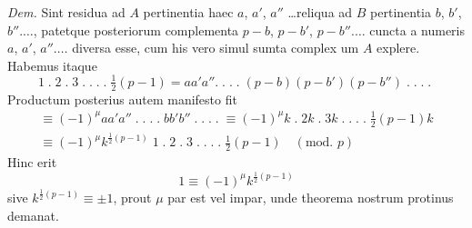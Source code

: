 \documentclass[14pt]{memoir}
\begin{document}
\textit{Dem.} Sint residua ad \(A\) pertinentia haec \(a\), \(a'\), \(a''\)  \ldots reliqua ad \(B\) pertinentia \(b\), \(b'\), \(b''.  \ldots\), patetque posteriorum complementa \(p-b\), \(p-b'\), \(p-b''. \ldots\) cuncta a numeris \(a\), \(a'\), \(a''. \ldots\) diversa esse, cum his vero simul sumta complex%
um \(A\) explere. Habemus itaque 
\[ 1\;.\;2\;.\;3\;.\;.\;.\;.\;\tfrac{1}{2}(p-1) = a a' a''.\;.\;.\;.\;(p-b)(p-b')(p-b'')\;.\;.\;.\;.\; \]
Productum posterius autem manifesto fit 
\[\begin{array}{l} \equiv (-1)^{\mu} aa'a''\;.\;.\;.\;.\;bb'b''\;.\;.\;.\;.\;\equiv(-1)^\mu k \;.\; 2k \;.\; 3k\;.\;.\;.\;.\; \tfrac{1}{2}(p-1)k \\
\equiv (-1)^\mu k^{\frac{1}{2}(p-1)} \;1 \;.\; 2 \;.\; 3 \;.\;.\;.\;.\; \tfrac{1}{2}(p-1) \quad (\textrm{mod. }p)  \end{array}\]
Hinc erit 
\[ 1 \equiv (-1)^{\mu} k^{\frac{1}{2}(p-1)} \]
sive \(k^{\frac{1}{2}(p-1)} \equiv \pm 1\), prout \(\mu\) par est vel impar, unde theorema nostrum protinus demanat. 
\end{document}
